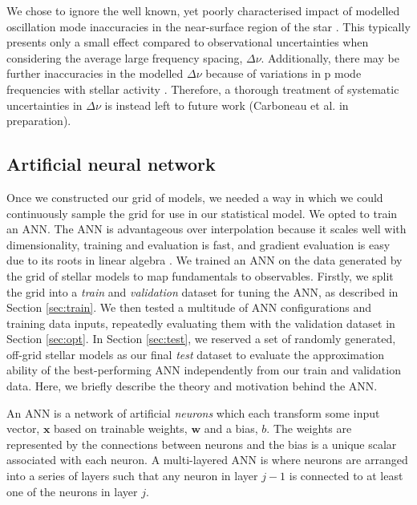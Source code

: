 \documentclass[a4paper,fleqn,usenatbib]{mnras}
\newcommand{\dnu}{\ensuremath{\Delta\nu}}
\begin{document}
We chose to ignore the well known, yet poorly characterised impact of modelled oscillation mode inaccuracies in the near-surface region of the star \citep{Kjeldsen.Bedding.ea2008, Ball.Gizon2014, Sonoi.Samadi.ea2015}. This typically presents only a small effect compared to observational uncertainties when considering the average large frequency spacing, $\dnu$. Additionally, there may be further inaccuracies in the modelled $\dnu$ because of variations in p mode frequencies with stellar activity \citep{Chaplin.Elsworth.ea2007, Garcia.Mathur.ea2010, Kiefer.Schad.ea2017}. Therefore, a thorough treatment of systematic uncertainties in $\dnu$ is instead left to future work (Carboneau et al. in preparation). %

\subsection{Artificial neural network}\label{sec:ann}

Once we constructed our grid of models, we needed a way in which we could continuously sample the grid for use in our statistical model. We opted to train an ANN. The ANN is advantageous over interpolation because it scales well with dimensionality, training and evaluation is fast, and gradient evaluation is easy due to its roots in linear algebra \citep{Haykin2007}. We trained an ANN on the data generated by the grid of stellar models to map fundamentals to observables. Firstly, we split the grid into a \emph{train} and \emph{validation} dataset for tuning the ANN, as described in Section \ref{sec:train}. We then tested a multitude of ANN configurations and training data inputs, repeatedly evaluating them with the validation dataset in Section \ref{sec:opt}. In Section \ref{sec:test}, we reserved a set of randomly generated, off-grid stellar models as our final \emph{test} dataset to evaluate the approximation ability of the best-performing ANN independently from our train and validation data. Here, we briefly describe the theory and motivation behind the ANN.

An ANN is a network of artificial \emph{neurons} which each transform some input vector, $\boldsymbol{x}$ based on trainable weights, $\boldsymbol{w}$ and a bias, $b$. The weights are represented by the connections between neurons and the bias is a unique scalar associated with each neuron. A multi-layered ANN is where neurons are arranged into a series of layers such that any neuron in layer $j-1$ is connected to at least one of the neurons in layer $j$. 
\end{document}
